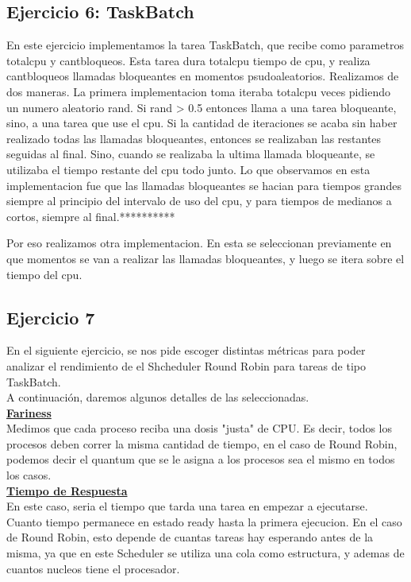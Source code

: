\subsection{Ejercicio 6: TaskBatch}

En este ejercicio implementamos la tarea TaskBatch, que recibe como parametros totalcpu y cantbloqueos. Esta tarea dura totalcpu tiempo de 
cpu, y realiza cantbloqueos llamadas bloqueantes en momentos psudoaleatorios. Realizamos de dos maneras. La primera implementacion toma iteraba totalcpu
veces pidiendo un numero aleatorio rand. Si rand > 0.5 entonces llama a una tarea bloqueante, sino, a una tarea que use el cpu. Si la cantidad 
de iteraciones se acaba sin haber realizado todas las llamadas bloqueantes, entonces se realizaban las restantes seguidas al final. Sino, cuando se realizaba
la ultima llamada bloqueante, se utilizaba el tiempo restante del cpu todo junto. Lo que observamos en esta implementacion fue que las llamadas bloqueantes
se hacian para tiempos grandes siempre al principio del intervalo de uso del cpu, y para tiempos de medianos a cortos, siempre al final.**********

Por eso realizamos otra implementacion. En esta se seleccionan previamente en que momentos se van a realizar las llamadas bloqueantes, y luego se itera 
sobre el tiempo del cpu.


\subsection{Ejercicio 7}
En el siguiente ejercicio, se nos pide escoger distintas m\'etricas para poder analizar el rendimiento de el Shcheduler Round Robin para tareas de tipo TaskBatch.\\
A continuaci\'on, daremos algunos detalles de las seleccionadas.\\

\textbf{\underline{Fariness}}\\
Medimos que cada proceso reciba una dosis "justa" de CPU. Es decir, todos los procesos deben correr la misma cantidad de tiempo, en el caso de Round Robin, podemos decir el quantum que se le asigna a los procesos sea el mismo en todos los casos.\\

\textbf{\underline{Tiempo de Respuesta}}\\
En este caso, seria el tiempo que tarda una tarea en empezar a ejecutarse.
Cuanto tiempo permanece en estado ready hasta la primera ejecucion.
En el caso de Round Robin, esto depende de cuantas tareas hay esperando antes de la misma, ya que en este Scheduler se utiliza una cola como estructura, y ademas de cuantos nucleos tiene el procesador.\\

